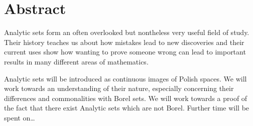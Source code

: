 \section*{Abstract}

Analytic sets form an often overlooked but nontheless very useful field of study. 
Their history teaches us about how mistakes lead to new discoveries and their current uses show how wanting to prove someone wrong can lead to important results in many different areas of mathematics. 

Analytic sets will be introduced as continuous images of Polish spaces. 
We will work towards an understanding of their nature, especially concerning their differences and commonalities with Borel sets.
We will work towards a proof of the fact that there exist Analytic sets which are not Borel. 
Further time will be spent on\ldots

